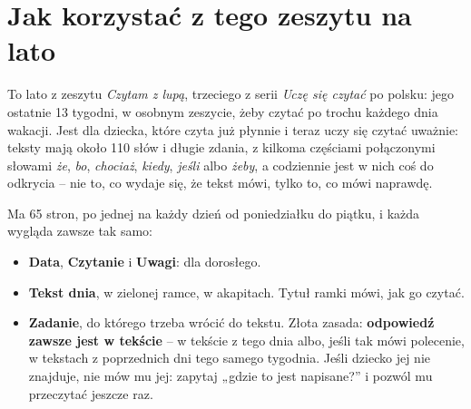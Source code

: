 \section*{Jak korzystać z tego zeszytu na lato}

To lato z zeszytu \emph{Czytam z lupą}, trzeciego z serii \emph{Uczę się
czytać} po polsku: jego ostatnie 13 tygodni, w osobnym zeszycie, żeby
czytać po trochu każdego dnia wakacji. Jest dla dziecka, które czyta już
płynnie i teraz uczy się czytać uważnie: teksty mają około 110 słów i
długie zdania, z kilkoma częściami połączonymi słowami \textit{że},
\textit{bo}, \textit{chociaż}, \textit{kiedy}, \textit{jeśli} albo
\textit{żeby}, a codziennie jest w nich coś do odkrycia -- nie to, co
wydaje się, że tekst mówi, tylko to, co mówi naprawdę.

Ma 65 stron, po jednej na każdy dzień od poniedziałku do piątku, i każda
wygląda zawsze tak samo:

\begin{itemize}[leftmargin=6mm, itemsep=1mm]
\item \textbf{Data}, \textbf{Czytanie} i \textbf{Uwagi}: dla dorosłego.
\item \textbf{Tekst dnia}, w zielonej ramce, w akapitach. Tytuł ramki
  mówi, jak go czytać.
\item \textbf{Zadanie}, do którego trzeba wrócić do tekstu. Złota
  zasada: \textbf{odpowiedź zawsze jest w tekście} -- w tekście z tego
  dnia albo, jeśli tak mówi polecenie, w tekstach z poprzednich dni tego
  samego tygodnia. Jeśli dziecko jej nie znajduje, nie mów mu jej:
  zapytaj „gdzie to jest napisane?” i pozwól mu przeczytać jeszcze raz.
\end{itemize}

